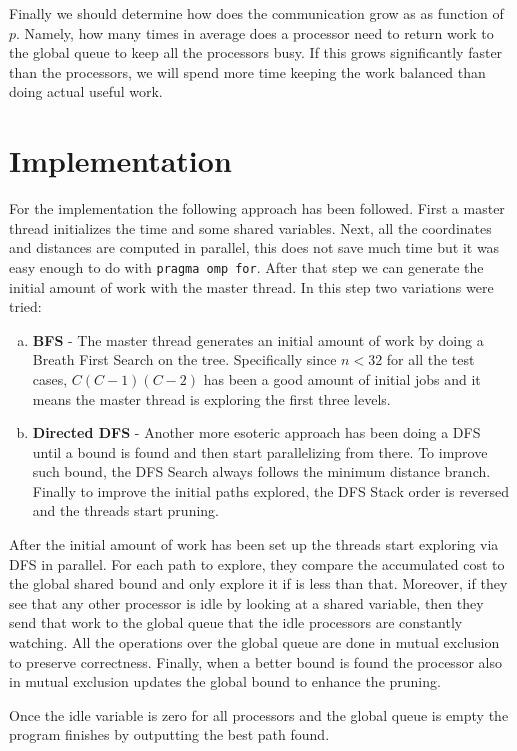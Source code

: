 \documentclass[a4paper]{article}
\begin{document}
    Finally we should determine how does the communication grow as as function of $p$. Namely, how many times in average does a processor need to return work to the global queue to keep all the processors busy. If this grows significantly faster than the processors, we will spend more time keeping the work balanced than doing actual useful work.
\newpage
\section{Implementation}
    For the implementation the following approach has been followed. First a master thread initializes the time and some shared variables. Next, all the coordinates and distances are computed in parallel, this does not save much time but it was easy enough to do with \texttt{pragma omp for}. After that step we can generate the initial amount of work with the master thread. In this step two variations were tried:
    \begin{enumerate}[a)]
      \item \textbf{BFS} - The master thread generates an initial amount of work by doing a Breath First Search on the tree. Specifically since $n < 32$ for all the test cases, $C(C-1)(C-2)$ has been a good amount of initial jobs and it means the master thread is exploring the first three levels.
      \item \textbf{Directed DFS} - Another more esoteric approach has been doing a DFS until a bound is found and then start parallelizing from there. To improve such bound, the DFS Search always follows the minimum distance branch. Finally to improve the initial paths explored, the DFS Stack order is reversed and the threads start pruning.
    \end{enumerate}

    After the initial amount of work has been set up the threads start exploring via DFS in parallel. For each path to explore, they compare the accumulated cost to the global shared bound and only explore it if is less than that. Moreover, if they see that any other processor is idle by looking at a shared variable, then they send that work to the global queue that the idle processors are constantly watching. All the operations over the global queue are done in mutual exclusion to preserve correctness. Finally, when a better bound is found the processor also in mutual exclusion updates the global bound to enhance the pruning.

    Once the idle variable is zero for all processors and the global queue is empty the program finishes by outputting the best path found.
\end{document}
